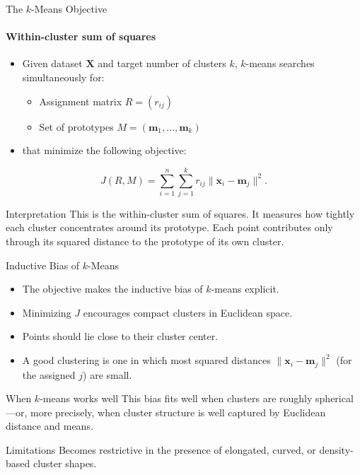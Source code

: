 \begin{frame}{The $k$-Means Objective}
  \framesubtitle{Within-cluster sum of squares}
  \begin{itemize}
    \item Given dataset $\mathbf{X}$ and target number of clusters $k$, $k$-means searches
          simultaneously for:
      \begin{itemize}
        \item Assignment matrix $R=(r_{ij})$
        \item Set of prototypes $M=(\mathbf{m}_1,\ldots,\mathbf{m}_k)$
      \end{itemize}
    \item that minimize the following objective:
  \end{itemize}
  \[
  J(R,M)=\sum_{i=1}^{n}\sum_{j=1}^{k} r_{ij}\|\mathbf{x}_i-\mathbf{m}_j\|^2.
  \]
  \begin{block}{Interpretation}
    This is the \alert{within-cluster sum of squares}. It measures how tightly each cluster
    concentrates around its prototype. Each point contributes only through its squared
    distance to the prototype of its own cluster.
  \end{block}
\end{frame}

\begin{frame}{Inductive Bias of $k$-Means}
  \begin{itemize}
    \item The objective makes the inductive bias of $k$-means explicit.
    \item Minimizing $J$ encourages \alert{compact} clusters in Euclidean space.
    \item Points should lie close to their cluster center.
    \item A good clustering is one in which most squared distances $\|\mathbf{x}_i-
          \mathbf{m}_j\|^2$ (for the assigned $j$) are small.
  \end{itemize}
  \begin{alertblock}{When $k$-means works well}
    This bias fits well when clusters are roughly \alert{spherical}---or, more precisely,
    when cluster structure is well captured by Euclidean distance and means.
  \end{alertblock}
  \begin{alertblock}{Limitations}
    Becomes restrictive in the presence of elongated, curved, or density-based cluster shapes.
  \end{alertblock}
\end{frame}

